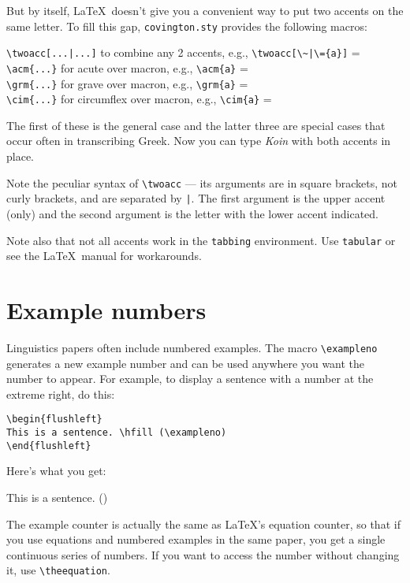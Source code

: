 \documentclass{article}
\begin{document}
But by itself, \LaTeX\ doesn't give you a convenient way to put two
accents on the same letter.  To fill this gap, \texttt{covington.sty} provides
the following macros:
\begin{flushleft}
\verb,\twoacc[...|...], \quad to combine any 2 accents, e.g.,
               \verb.\twoacc[\~|\={a}]. = \twoacc[\~|\={a}]\\[6pt]
\verb,\acm{...}, \quad for acute over macron, e.g., \verb.\acm{a}. = \\
\verb,\grm{...}, \quad for grave over macron, e.g., \verb.\grm{a}. = \\
\verb,\cim{...}, \quad for circumflex over macron, e.g., \verb.\cim{a}. = 
\end{flushleft}
The first of these is the general case and the latter three are special
cases that occur often in transcribing Greek.  Now you can type
\emph{Koin} with both accents in place.

Note the peculiar syntax of \verb.\twoacc. --- its arguments are in
square brackets, not curly brackets, and are separated by \verb.|..
The first argument is the upper accent (only) and the second argument
is the letter with the lower accent indicated.

Note also that not all accents work in the \texttt{tabbing} environment.
Use \texttt{tabular} or see the \LaTeX\ manual for workarounds.

\section{Example numbers}

Linguistics papers often include numbered examples.
The macro \verb"\exampleno" generates a new example number and can be 
used anywhere you want the number to appear.  For example, to display a 
sentence with a number at the extreme right, do this:
\begin{verbatim}
\begin{flushleft}
This is a sentence. \hfill (\exampleno)
\end{flushleft}
\end{verbatim}
Here's what you get:
\begin{flushleft}
This is a sentence. \hfill (\exampleno)
\end{flushleft}
The example counter is actually the same as \LaTeX's equation counter, 
so that if you use equations and numbered examples in the same
paper, you get a single continuous series of numbers. If you want to 
access the number without changing it, use \verb"\theequation".
\end{document}
